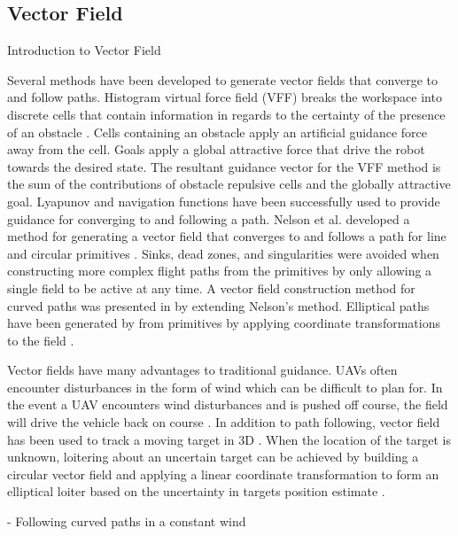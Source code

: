 \documentclass[numbered,pdftex]{ohio-etd}
\begin{document}
\subsection{Vector Field}
{Introduction to Vector Field}

Several methods have been developed to generate vector fields that converge to and follow paths. Histogram virtual force field (VFF) breaks the workspace into discrete cells that contain information in regards to the certainty of the presence of an obstacle \cite{borenstein_real-time_1990} \cite{borenstein_vector_1991}. Cells containing an obstacle apply an artificial guidance force away from the cell. Goals apply a global attractive force that drive the robot towards the desired state. The resultant guidance vector for the VFF method is the sum of the contributions of obstacle repulsive cells and the globally attractive goal. Lyapunov and navigation functions have been successfully used to provide guidance for converging to and following a path. Nelson et al. developed a method for generating a vector field that converges to and follows a path for line and circular primitives \cite{nelson_cooperative_2005}. Sinks, dead zones, and singularities were avoided when constructing more complex flight paths from the primitives by only allowing a single field to be active at any time. A vector field construction method for curved paths was presented in \cite{griffiths_vector_2006} by extending Nelson's method. Elliptical paths have been generated by from primitives by applying coordinate transformations to the field \cite{frew_lyapunov_nodate}.




Vector fields have many advantages to traditional guidance. UAVs often encounter disturbances in the form of wind which can be difficult to plan for. In the event a UAV encounters wind disturbances and is pushed off course, the field will drive the vehicle back on course \cite{de_marina_guidance_2017}. In addition to path following, vector field has been used to track a moving target in 3D \cite{miao_orthogonal_2016}. When the location of the target is unknown, loitering about an uncertain target can be achieved by building a circular vector field and applying a linear coordinate transformation to form an elliptical loiter based on the uncertainty in targets position estimate \cite{frew_cooperative_2007}. 


%
%
%
%

- Following curved paths in a constant wind \cite{griffiths_vector_2006}
\end{document}
